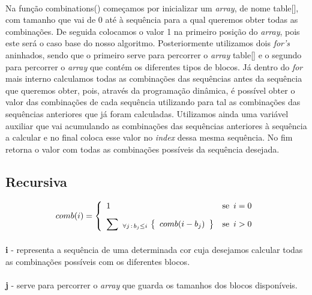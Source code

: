 \documentclass[12pt]{article}
\begin{document}
\paragraph{}
Na função combinations() começamos por inicializar um \textit{array}, de nome table[], com tamanho que vai de 0 até à sequência para a qual queremos obter todas as combinações. De seguida colocamos o valor 1 na primeiro posição do \textit{array}, pois este será o caso base do nosso algoritmo. Posteriormente utilizamos dois \textit{for's} aninhados, sendo que o primeiro serve para percorrer o \textit{array} table[] e o segundo para percorrer o \textit{array} que contém os diferentes tipos de blocos. Já dentro do \textit{for} mais interno calculamos todas as combinações das sequências antes da sequência que queremos obter, pois, através da programação dinâmica, é possível obter o valor das combinações de cada sequência utilizando para tal as combinações das sequências anteriores que já foram calculadas. Utilizamos ainda uma variável auxiliar que vai acumulando as combinações das sequências anteriores à sequência a calcular e no final coloca esse valor no \textit{index} dessa mesma sequência. No fim retorna o valor com todas as combinações possíveis da sequência desejada. 

\newpage
\begin{center}
\section{Recursiva}
\end{center}
\begin{equation}
comb(i) = \left \{
	    \begin{array}{l@{\quad}l}
	      1  & \mbox{se }\, i = 0          \\[8pt]
	      \displaystyle {\sum} \, \, \, _{\forall j \, : \, b_j \le i} \, \left\{ \begin{array}{c}
		  comb(i - b_j)
		\end{array} \right\}
		& \mbox{se }\, i > 0
	  \end{array} \right .
\end{equation}
\paragraph{}
\textbf{i} - representa a sequência de uma determinada cor cuja desejamos calcular todas as combinações possíveis com os diferentes blocos.
\paragraph{}
\textbf{j} - serve para percorrer o \textit{array} que guarda os tamanhos dos blocos disponíveis.
\end{document}
